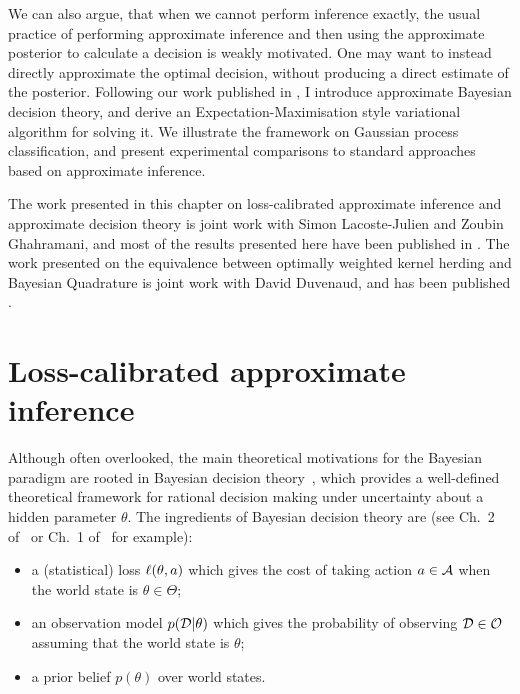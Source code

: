 We can also argue, that when we cannot perform inference exactly, the usual practice of performing approximate inference and then using the approximate posterior to calculate a decision is weakly motivated. One may want to instead directly approximate the optimal decision, without producing a direct estimate of the posterior. Following our work published in \cite{Simonspaper}, I introduce approximate Bayesian decision theory, and derive an Expectation-Maximisation style variational algorithm for solving it. We illustrate the framework on Gaussian process classification, and present experimental comparisons to standard approaches based on approximate inference.

The work presented in this chapter on loss-calibrated approximate inference and approximate decision theory is joint work with Simon Lacoste-Julien and Zoubin Ghahramani, and most of the results presented here have been published in \cite{losscalibrated}.
The work presented on the equivalence between optimally weighted kernel herding and Bayesian Quadrature is joint work with David Duvenaud, and has been published \cite{losscalibrated}.

\section{Loss-calibrated approximate inference}

Although often overlooked, the main theoretical motivations for the Bayesian paradigm are rooted in Bayesian decision theory~\cite{berger85decision}, which provides a well-defined theoretical framework for rational decision making under uncertainty about a hidden parameter $\theta$. The ingredients of Bayesian decision theory are (see Ch.~2 of~\cite{robert01choice} or Ch.~1 of~\cite{berger85decision} for example):
\vspace{-.3cm}
\begin{itemize}
  \item a (statistical) loss $\ell(\theta,a)$ which gives the cost of taking action $a \in \mathcal{A}$ when the world state is $\theta \in \Theta$; %
  \item an observation model $p(\mathcal{D}|\theta)$ which gives the probability of observing $\mathcal{D} \in \mathcal{O}$ assuming that the world state is $\theta$;
  \item a prior belief $p(\theta)$ over world states.
\end{itemize}

